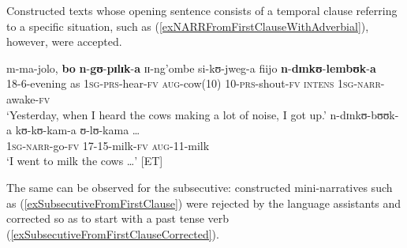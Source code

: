 Constructed texts whose opening sentence consists of a temporal clause referring to a specific situation, such as (\ref{exNARRFromFirstClauseWithAdverbial}), however, were accepted.
\begin{exe} %
	\ex \label{exNARRFromFirstClauseWithAdverbial} \begin{xlist}
		\ex \gll m-ma-jolo, \textbf{bo} \textbf{n}-\textbf{gʊ}-\textbf{pɪlɪk}-\textbf{a} ɪɪ-ng'ombe si-kʊ-jweg-a fiijo \textbf{n}-\textbf{dɪnkʊ}-\textbf{lembʊk}-\textbf{a}\\
		18-6-evening as \textsc{1sg}-\textsc{prs}-hear-\textsc{fv} \textsc{aug}-cow(10) 10-\textsc{prs}-shout-\textsc{fv} \textsc{intens} \textsc{1sg}-\textsc{narr}-awake-\textsc{fv}\\
		\glt `Yesterday, when I heard the cows making a lot of noise, I got up.'
		\ex \gll n-dɪnkʊ-bʊʊk-a kʊ-kʊ-kam-a ʊ-lʊ-kama \ldots\\
		\textsc{1sg}-\textsc{narr}-go-\textsc{fv} 17-15-milk-\textsc{fv} \textsc{aug}-11-milk\\
		\glt `I went to milk the cows …' [ET]
	\end{xlist}
\end{exe}

The same can be observed for the subsecutive: constructed mini-narratives such as (\ref{exSubsecutiveFromFirstClause}) were rejected by the language assistants and corrected so as to start with a past tense verb (\ref{exSubsecutiveFromFirstClauseCorrected}).

